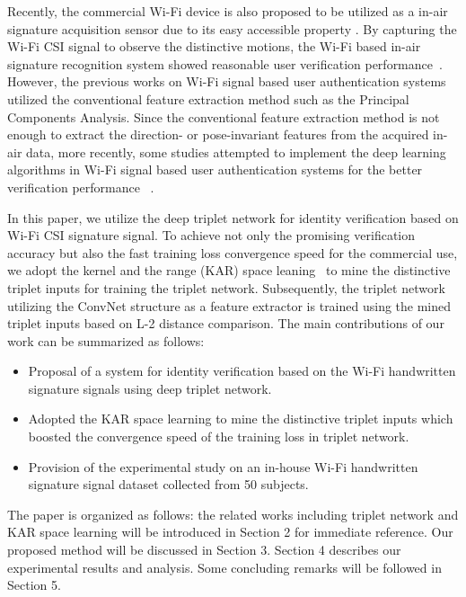 \documentclass[runningheads]{llncs}
\begin{document}
Recently, the commercial Wi-Fi device is also proposed to be utilized as a in-air signature acquisition sensor due to its easy accessible property \cite{moon2017air}. By capturing the Wi-Fi CSI signal to observe the distinctive motions, the Wi-Fi based in-air signature recognition system showed reasonable user verification performance~\cite{moon2017air}. However, the previous works on Wi-Fi signal based user authentication systems~\cite{hong2016wfid,moon2017air} utilized the conventional feature extraction method such as the Principal Components Analysis. Since the conventional feature extraction method is not enough to extract the direction- or pose-invariant features from the acquired in-air data, more recently, some studies attempted to implement the deep learning algorithms in Wi-Fi signal based user authentication systems for the better verification performance ~\cite{shi2017smart,pokkunuru2018neuralwave}. 

In this paper, we utilize the deep triplet network for identity verification based on Wi-Fi CSI signature signal. To achieve not only the promising verification accuracy but also the fast training loss convergence speed for the commercial use, we adopt the kernel and the range (KAR) space leaning~\cite{toh100,toh2018learning,toh2018analytic,toh2018gradient} to mine the distinctive triplet inputs for training the triplet network. Subsequently, the triplet network utilizing the ConvNet structure as a feature extractor is trained using the mined triplet inputs based on L-2 distance comparison.
The main contributions of our work can be summarized as follows:
\begin{itemize}
\item Proposal of a system for identity verification based on the Wi-Fi handwritten signature signals using deep triplet network.
\item Adopted the KAR space learning to mine the distinctive triplet inputs which boosted the convergence speed of the training loss in triplet network.
\item Provision of the experimental study on an in-house Wi-Fi handwritten signature signal dataset collected from 50 subjects.
\end{itemize}

The paper is organized as follows: the related works including triplet network and KAR space learning will be introduced in Section 2 for immediate reference. Our proposed method will be discussed in Section 3. Section 4 describes our experimental results and analysis. Some concluding remarks will be followed in Section 5.
\end{document}
